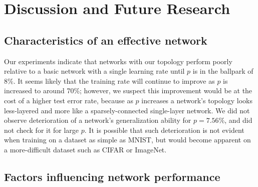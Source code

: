 \documentclass[format=sigconf]{acmart}
\begin{document}
\section{Discussion and Future Research}

\subsection{Characteristics of an effective network}

Our experiments indicate that networks with our topology perform poorly relative to a basic network with a single learning rate until $p$ is in the ballpark of $8\%$. It seems likely that the training rate will continue to improve as $p$ is increased to around 70\%; however, we suspect this improvement would be at the cost of a higher test error rate, because as $p$ increases a network's topology looks less-layered and more like a sparsely-connected single-layer network. We did not observe deterioration of a network's generalization ability for $p=7.56\%$, and did not check for it for large $p$. It is possible that such deterioration is not evident when training on a dataset as simple as MNIST, but would become apparent on a more-difficult dataset such as CIFAR or ImageNet.

\subsection{Factors influencing network performance}
\label{sec:disc_factors}
\end{document}
